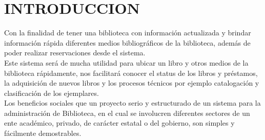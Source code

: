\section{INTRODUCCION} 


Con la finalidad de tener una biblioteca con información actualizada y brindar información rápida diferentes medios bibliográficos de la biblioteca, además de poder realizar reservaciones desde el sistema.
\\
Este sistema será de mucha utilidad para ubicar un libro y otros medios de la biblioteca rápidamente, nos facilitará conocer el status de los libros y préstamos, la adquisición de nuevos libros y los procesos técnicos por ejemplo catalogación y clasificación de los ejemplares.
\\

Los beneficios sociales que un proyecto serio y estructurado de un sistema para la administración de Biblioteca, en el cual se involucren diferentes sectores de un ente académico, privado, de carácter estatal o del gobierno, son simples y fácilmente demostrables.\\

